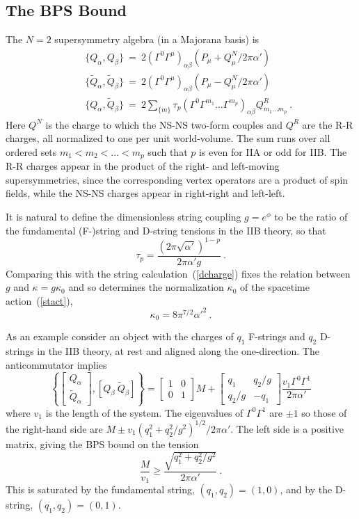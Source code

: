 \documentclass[12pt]{article}
\def\be{\begin{equation}}
\def\ee{\end{equation}}
\def\bea{\begin{eqnarray}}
\def\eea{\end{eqnarray}}
\def\ap{\alpha'}
\def\apm{\alpha'}
\begin{document}
\subsection{The BPS Bound}

The $N=2$ supersymmetry algebra (in a
Majorana basis) is
\bea
&& \{ Q_\alpha, Q_\beta \}\ 
=\ 2(\Gamma^0 \Gamma^\mu)_{\alpha\beta} ( P_\mu + Q^N_\mu/2\pi\ap )
\nonumber\\ 
&& \{ \tilde Q_\alpha, \tilde Q_\beta\}\ =\ 2(\Gamma^0
\Gamma^\mu)_{\alpha\beta} ( P_\mu - Q^N_\mu/2\pi\ap )
\nonumber\\ 
&& \{ Q_\alpha, \tilde Q_\beta \}\ =\ 2 \sum_{\{m\}} \tau_p (\Gamma^0
\Gamma^{m_1} \ldots \Gamma^{m_p})_{\alpha\beta} Q^R_{m_1\ldots m_p} \ .
\eea
Here $Q^N$ is the charge to which the NS-NS two-form couples and $Q^R$ are
the R-R charges, all normalized to one per unit world-volume.  The sum runs
over all ordered sets $m_1 < m_2 < \ldots < m_p$ such that
$p$ is even for IIA or odd for
IIB.  The R-R charges appear in the product of the right- and left-moving
supersymmetries, since the corresponding vertex operators are a product of
spin fields, while the NS-NS charges appear in right-right and left-left.

It is natural to define the dimensionless string coupling $g = e^\phi$ to be
the ratio of the fundamental (F-)string and D-string tensions in the IIB
theory, so that
\be
\tau_p = \frac{(2\pi\sqrt{\ap})^{1-p}}{2\pi\apm g}\ .
\ee
Comparing this with the string calculation~(\ref{dcharge}) fixes the relation
between $g$ and $\kappa = g \kappa_0$ and so determines the normalization
$\kappa_0$ of the spacetime action~(\ref{stact}), \cite{shanta}
\be
\kappa_0 = 8 \pi^{7/2} \ap^2\ .  \label{kap0}
\ee

As an example consider an object with the charges of $q_1$ F-strings
and $q_2$ D-strings in the IIB theory, at rest and aligned along the
one-direction.  The anticommutator implies
\be
\left\{ \left[ \begin{array}{c} Q_\alpha \\ \tilde Q_\alpha \end{array}
\right] , \left[ Q_\beta\ \tilde Q_\beta \right] \right\}
= \left[ \begin{array}{cc} 1&0 \\ 0&1 \end{array} \right] M +
\left[ \begin{array}{cc} q_1&q_2/g \\ q_2/g&-q_1 \end{array} \right]
\frac{v_1 \Gamma^0 \Gamma^1}{2\pi\apm}
\ee
where $v_1$ is the length of the system. 
The eigenvalues of $\Gamma^0 \Gamma^1$ are $\pm 1$ so those of the
right-hand side are $M \pm v_1 (q_1^2 + q_2^2/g^2)^{1/2}/2\pi\ap$.  The left
side is a positive matrix, giving the BPS bound on the tension \cite{schwarz}
\be
\frac{M}{v_1} \geq \frac{\sqrt{q_1^2 + q_2^2/g^2}}{2\pi\apm}\ . \label{fdbps}
\ee
This is saturated by the fundamental string, $(q_1,q_2) = (1,0)$, and by the
D-string, $(q_1,q_2) = (0,1)$. 
\end{document}
